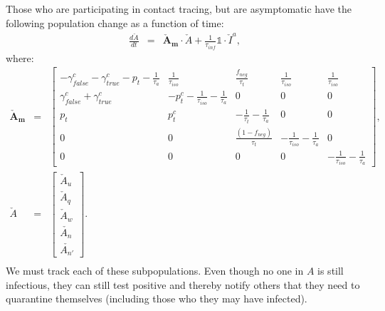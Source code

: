 \documentclass[notitlepage, superscriptaddress]{revtex4-2}
\begin{document}
Those who are participating in contact tracing, but are asymptomatic have the following population change as a function of time:
\begin{eqnarray}
\frac{d\check{A}}{dt} &=& \boldsymbol{\check{A}_{m}} \cdot  \check{A} + \frac{1}{\tau_{inf}} \mathbb{1} \cdot  \check{I}^{a}, 
\end{eqnarray}
where:
%
\begin{eqnarray}
\boldsymbol{\check{A}_{m}}&=&
\begin{bmatrix}
 -\gamma^{c}_{false} -\gamma^{c}_{true} - p_{t} -\frac{1}{\tau_{a}} & \frac{1}{\tau_{iso}}  & \frac{f_{neg}}{\tau_{t}} & \frac{1}{\tau_{iso}} & \frac{1}{\tau_{iso}} \\
\gamma^{c}_{false} + \gamma^{c}_{true}    &  -p^{c}_{t}  - \frac{1}{\tau_{iso}} - \frac{1}{\tau_{a}}      &  0    & 0  & 0\\
p_{t}     &  p^{c}_{t}                  &  -\frac{1}{\tau_{t}}  - \frac{1}{\tau_{a}}  & 0 & 0\\
0 & 0 & \frac{(1-f_{neg})}{\tau_{t}}  & -\frac{1}{\tau_{iso}}  -  \frac{1}{\tau_{a}} & 0 \\ 
0 & 0 & 0 & 0 & -\frac{1}{\tau_{iso}}  -  \frac{1}{\tau_{a}}
\end{bmatrix}, \\ 
%
\check{A} &=& 
\begin{bmatrix}
\check{A}_{u} \\ \check{A}_{q} \\ \check{A}_{w}\\ \check{A_{n}} \\ \check{A_{n'}}
\end{bmatrix}. \\ 
%
% 
\end{eqnarray}
We must track each of these subpopulations. Even though no one in $A$ is still infectious, they can still test positive and thereby notify others that they need to quarantine themselves (including those who they may have infected). 
\end{document}
